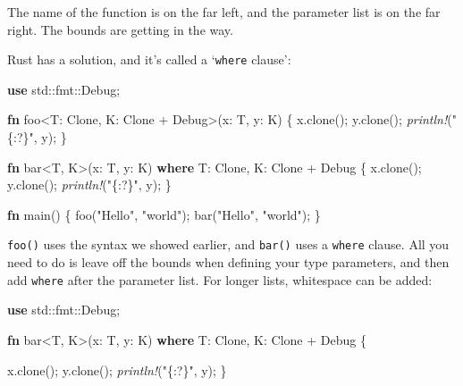 \documentclass[a4paper,]{book}
\newenvironment{Shaded}{\begin{snugshade}}{\end{snugshade}}
\newcommand{\KeywordTok}[1]{\textcolor[rgb]{0.13,0.29,0.53}{\textbf{{#1}}}}
\newcommand{\StringTok}[1]{\textcolor[rgb]{0.31,0.60,0.02}{{#1}}}
\newcommand{\BuiltInTok}[1]{{#1}}
\newcommand{\PreprocessorTok}[1]{\textcolor[rgb]{0.56,0.35,0.01}{\textit{{#1}}}}
\newcommand{\NormalTok}[1]{{#1}}
\begin{document}
The name of the function is on the far left, and the parameter list is
on the far right. The bounds are getting in the way.

Rust has a solution, and it's called a `\texttt{where} clause':

\begin{Shaded}
\begin{Highlighting}[]
\KeywordTok{use} \NormalTok{std::fmt::}\BuiltInTok{Debug}\NormalTok{;}

\KeywordTok{fn} \NormalTok{foo<T: }\BuiltInTok{Clone}\NormalTok{, K: }\BuiltInTok{Clone} \NormalTok{+ }\BuiltInTok{Debug}\NormalTok{>(x: T, y: K) \{}
    \NormalTok{x.clone();}
    \NormalTok{y.clone();}
    \PreprocessorTok{println!}\NormalTok{(}\StringTok{"\{:?\}"}\NormalTok{, y);}
\NormalTok{\}}

\KeywordTok{fn} \NormalTok{bar<T, K>(x: T, y: K) }\KeywordTok{where} \NormalTok{T: }\BuiltInTok{Clone}\NormalTok{, K: }\BuiltInTok{Clone} \NormalTok{+ }\BuiltInTok{Debug} \NormalTok{\{}
    \NormalTok{x.clone();}
    \NormalTok{y.clone();}
    \PreprocessorTok{println!}\NormalTok{(}\StringTok{"\{:?\}"}\NormalTok{, y);}
\NormalTok{\}}

\KeywordTok{fn} \NormalTok{main() \{}
    \NormalTok{foo(}\StringTok{"Hello"}\NormalTok{, }\StringTok{"world"}\NormalTok{);}
    \NormalTok{bar(}\StringTok{"Hello"}\NormalTok{, }\StringTok{"world"}\NormalTok{);}
\NormalTok{\}}
\end{Highlighting}
\end{Shaded}

\texttt{foo()} uses the syntax we showed earlier, and \texttt{bar()}
uses a \texttt{where} clause. All you need to do is leave off the bounds
when defining your type parameters, and then add \texttt{where} after
the parameter list. For longer lists, whitespace can be added:

\begin{Shaded}
\begin{Highlighting}[]
\KeywordTok{use} \NormalTok{std::fmt::}\BuiltInTok{Debug}\NormalTok{;}

\KeywordTok{fn} \NormalTok{bar<T, K>(x: T, y: K)}
    \KeywordTok{where} \NormalTok{T: }\BuiltInTok{Clone}\NormalTok{,}
          \NormalTok{K: }\BuiltInTok{Clone} \NormalTok{+ }\BuiltInTok{Debug} \NormalTok{\{}

    \NormalTok{x.clone();}
    \NormalTok{y.clone();}
    \PreprocessorTok{println!}\NormalTok{(}\StringTok{"\{:?\}"}\NormalTok{, y);}
\NormalTok{\}}
\end{Highlighting}
\end{Shaded}
\end{document}
